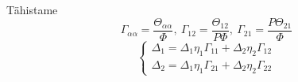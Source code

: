 \documentclass[class=article, crop=false]{standalone}
\begin{document}
Tähistame
\begin{equation}\label{key}
	\Gamma_{ \alpha \alpha} = \frac{ \Theta_{ \alpha \alpha}}{ \Phi},\ \Gamma_{12} = \frac{ \Theta_{12}}{P \Phi},\ \Gamma_{21} = \frac{P \Theta_{21}}{ \Phi}
\end{equation}
\begin{equation}\label{PiluVorrandiSusteemGamma}
	\begin{cases}
		\Delta_{1} = \Delta_{1} \eta_{ 1} \Gamma_{11} + \Delta_{2} \eta_{ 2} \Gamma_{12} \\
		\Delta_{2} = \Delta_{1} \eta_{ 1} \Gamma_{21} + \Delta_{2} \eta_{ 2} \Gamma_{22}
	\end{cases}
\end{equation}
\end{document}

